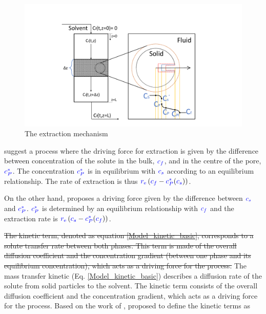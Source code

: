 \documentclass[../Parameter_fitting.tex]{subfiles}
\begin{document}
			\begin{figure}[h!]
				\centering
				\includegraphics[trim = 5.8cm 1.1cm 6cm 0.8cm,clip,width=1.0\linewidth]{Figures/SFE_draft.pdf}	
				\caption{The extraction mechanism}
				\label{fig: SFE_Mechanism}
			\end{figure}
			
			\citet{Bulley1984} suggest a process where the driving force for extraction is given by the difference between concentration of the solute in the bulk, ${\color{blue}c_f}$, and in the centre of the pore, ${\color{blue}c_P^*}$. The concentration ${\color{blue}c_P^*}$ is in equilibrium with ${\color{blue}c_s}$ according to an equilibrium relationship. The rate of extraction is thus ${\color{blue}r_\text{e}}\left({\color{blue}c_f} - {\color{blue}c^*_P}({\color{blue}c_s})\right)$. 
			
			On the other hand, \citet{Reverchon1996} proposes a driving force given by the difference between ${\color{blue}c_s}$ and ${\color{blue}c_P^*}$. ${\color{blue}c_P^*}$ is determined by an equilibrium relationship with ${\color{blue}c_f}$ and the extraction rate is ${\color{blue}r_\text{e}}\left({\color{blue}c_s} - {\color{blue}c^*_P}({\color{blue}c_f})\right)$.
			
			\sout{The kinetic term, denoted as equation \ref{Model_kinetic_basic}, corresponds to a solute transfer rate between both phases. This term is made of the overall diffusion coefficient and the concentration gradient (between one phase and its equilibrium concentration), which acts as a driving force for the process.} {\color{blue}The mass transfer kinetic (Eq. \ref{Model_kinetic_basic}) describes a diffusion rate of the solute from solid particles to the solvent. The kinetic term consists of the overall diffusion coefficient and the concentration gradient, which acts as a driving force for the process.} Based on the work of \citet{Bulley1984}, \citet{Reverchon1996} proposed to define the kinetic terms as
			
\end{document}
